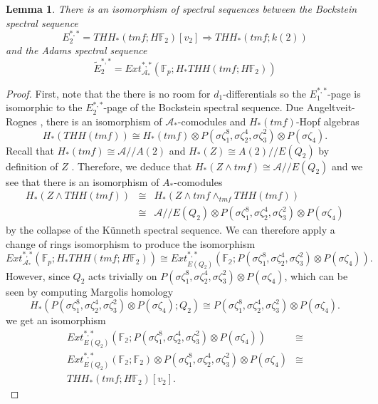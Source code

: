 \documentclass[12pt]{amsart}
\newtheorem{lem}[equation]{Lemma}
\theoremstyle{definition}
\numberwithin{equation}{section}
\numberwithin{figure}{section}
\begin{document}
\begin{lem} 
There is an isomorphism of spectral sequences between the Bockstein spectral sequence 
\begin{equation}
E_2^{*,*}=THH_*(tmf;H\mathbb{F}_2)[v_2]\Rightarrow THH_*(tmf;k(2))\end{equation}
and the Adams spectral sequence 
\begin{equation}
\tilde{E}_2^{*,*}=Ext_{\mathcal{A}_*}^{*,*}(\mathbb{F}_p;H_*THH(tmf;H\mathbb{F}_2)) 
\end{equation} 
\end{lem} 
\begin{proof}
First, note that the there is no room for $d_1$-differentials so the $E_1^{*,*}$-page is isomorphic to the $E_2^{*,*}$-page of the Bockstein spectral sequence. Due Angeltveit-Rognes \cite{qx}, there is an isomorphism of $\mathcal{A}_*$-comodules and $H_*(tmf)$-Hopf algebras 
\[H_*(THH(tmf))\cong H_*(tmf)\otimes P(\sigma \zeta_1^8,\sigma \zeta_2^4, \sigma \zeta_3^2)\otimes P(\sigma \zeta_4).\] 
Recall that $H_*(tmf)\cong \mathcal{A}//A(2)$ and $H_*(Z)\cong A(2)//E(Q_2)$ by definition of $Z$ \cite{BE16}. Therefore, we deduce that $H_*(Z\wedge tmf)\cong \mathcal{A}//E(Q_2)$
and we see that there is an isomorphism of $A_*$-comodules
\[ 
\begin{array}{rcl}
H_*(Z\wedge THH(tmf))& \cong & H_*(Z\wedge tmf\wedge_{tmf} THH(tmf)) \\
&\cong & \mathcal{A}//E(Q_2)\otimes P(\sigma \zeta_1^8,\sigma \zeta_2^4, \sigma \zeta_3^2)\otimes P(\sigma \zeta_4)
\end{array}
\]
by the collapse of the K\"unneth spectral sequence. We can therefore apply a change of rings isomorphism to produce the isomorphism 
\[Ext_{\mathcal{A}_*}^{*,*}(\mathbb{F}_p;H_*THH(tmf;H\mathbb{F}_2)) \cong Ext_{E(Q_2)}^{*,*}(\mathbb{F_2}; P(\sigma \zeta_1^8,\sigma \zeta_2^4, \sigma \zeta_3^2)\otimes P(\sigma \zeta_4)).\]
However, since $Q_2$ acts trivially on $P(\sigma \zeta_1^8,\sigma \zeta_2^4, \sigma \zeta_3^2)\otimes P(\sigma \zeta_4)$, which can be seen by computing Margolis homology 
\[ H_*(P(\sigma \zeta_1^8,\sigma \zeta_2^4, \sigma \zeta_3^2)\otimes P(\sigma \zeta_4);Q_2)\cong P(\sigma \zeta_1^8,\sigma \zeta_2^4, \sigma \zeta_3^2)\otimes P(\sigma \zeta_4).\]
we get an isomorphism
\[ 
\begin{array}{rc}
Ext_{E(Q_2)}^{*,*}(\mathbb{F_2}; P(\sigma \zeta_1^8,\sigma \zeta_2^4, \sigma \zeta_3^2)\otimes P(\sigma \zeta_4))&\cong \\
Ext_{E(Q_2)}^{*,*}(\mathbb{F_2}; \mathbb{F}_2)\otimes P(\sigma \zeta_1^8,\sigma \zeta_2^4, \sigma \zeta_3^2)\otimes P(\sigma \zeta_4)&\cong \\
THH_*(tmf;H\mathbb{F}_2)[v_2]. &
\end{array}
\]
\end{proof}
\end{document}
